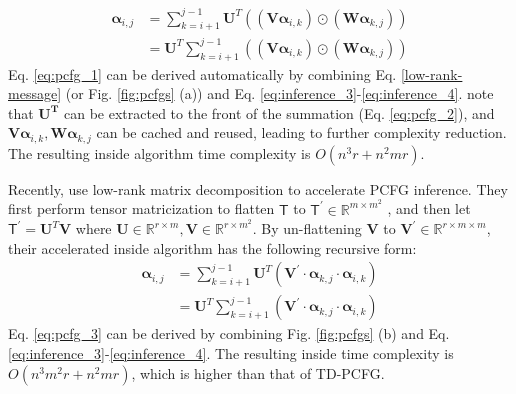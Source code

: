 \documentclass[11pt]{article}
\newcommand{\vect}[1]{\boldsymbol{\mathbf{#1}}}
\begin{document}
\begin{align}
\vect{\alpha}_{i, j} &= \sum_{k = i+1}^{j - 1} \vect{U}^{T} \left(\left(\vect{V}{\vect{\alpha}_{i, k}}\right)\odot \left(\vect{W}{\vect{\alpha}_{k, j}}\right)\right)
\label{eq:pcfg_1}
\\
&= \vect{U}^{T} \sum_{k = i+1}^{j - 1}  \left(\left(\vect{V}{\vect{\alpha}_{i, k}}\right)\odot \left(\vect{W}{\vect{\alpha}_{k, j}}\right)\right)
\label{eq:pcfg_2}
\end{align}
Eq. \ref{eq:pcfg_1} can be derived automatically by combining Eq. \ref{low-rank-message} (or Fig. \ref{fig:pcfgs} (a)) and Eq. \ref{eq:inference_3}-\ref{eq:inference_4}.  \citet{cohen-etal-2013-approximate} note that $\vect{U^T}$ can be extracted to the front of the summation (Eq. \ref{eq:pcfg_2}), and $\vect{V}\vect{\alpha}_{i, k}, \vect{W}{\vect{\alpha}_{k, j}}$ can be cached and reused, leading to further complexity reduction. The resulting inside algorithm time complexity is $O(n^3r + n^2mr)$.

Recently, \citet{chiu2021low} use low-rank matrix decomposition to accelerate PCFG inference. They first perform  tensor matricization to flatten $\mathsf{T}$ to $\mathsf{T}^{\prime} \in \mathbb{R}^{m \times m^2}$ , and then let $\mathsf{T}^{\prime} = \vect{U}^{T} \vect{V}$ where $\vect{U} \in \mathbb{R}^{r \times m}, \vect{V} \in \mathbb{R}^{r \times m^2}$. By un-flattening $\vect{V}$ to $\vect{V^{\prime}} \in \mathbb{R}^{r \times m \times m}$, their accelerated inside algorithm has the following recursive form:
\begin{align}
\vect{\alpha}_{i, j} &=  \sum_{k = i+1}^{j - 1} \vect{U}^{T} \left(\vect{V^{\prime}}\cdot \vect{\alpha}_{k, j} \cdot
\vect{\alpha}_{i, k} \right)
\label{eq:pcfg_3}
\\
&= \vect{U}^{T} \sum_{k = i+1}^{j - 1}  \left(\vect{V}^{\prime} \cdot \vect{\alpha}_{k, j} \cdot \vect{\alpha}_{i, k} \right)
\label{eq:pcfg_4}
\end{align}
Eq. \ref{eq:pcfg_3} can be derived by combining Fig. \ref{fig:pcfgs} (b) and Eq. \ref{eq:inference_3}-\ref{eq:inference_4}. The resulting inside time complexity is $O(n^3m^2r+n^2mr)$, which is higher than that of TD-PCFG.
\end{document}
